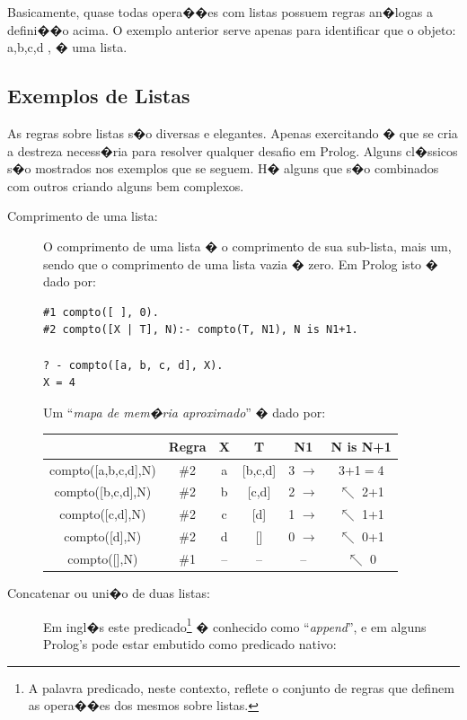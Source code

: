 \documentclass[final,a4paper]{article}
\begin{document}
Basicamente, quase todas opera��es com listas possuem regras an�logas a defini��o acima. O exemplo anterior serve apenas para identificar que o  objeto: \lbrack a,b,c,d \rbrack ,  � uma lista.

\newpage

\subsection{Exemplos de Listas}

As regras sobre listas s�o diversas e elegantes. Apenas exercitando
� que se cria a destreza necess�ria para resolver qualquer
desafio em Prolog.
Alguns  cl�ssicos s�o mostrados nos exemplos que se seguem. H� alguns
que s�o combinados com outros criando alguns bem complexos.


\begin{description}

\item [Comprimento de uma lista:]
O comprimento de uma lista � o comprimento de sua sub-lista, mais um,
sendo que o comprimento de uma lista vazia � zero. Em Prolog
isto � dado por:

\begin{verbatim}
#1 compto([ ], 0).
#2 compto([X | T], N):- compto(T, N1), N is N1+1.

? - compto([a, b, c, d], X).
X = 4
\end{verbatim}
Um ``{\em mapa de mem�ria aproximado}'' � dado por:

\begin{center}
\begin{tabular}[c]{|c|c|c|c|c|c|}
\hline
& Regra & X & T & N1 & N is N+1\\\hline
compto([a,b,c,d],N) & \#2 & a & [b,c,d] & 3 $\rightarrow$ & 3+1$=$4\\\hline
compto([b,c,d],N) & \#2 & b & [c,d] & 2 $\rightarrow$ & $\nwarrow$ 2+1\\\hline
compto([c,d],N) & \#2 & c & [d] & 1 $\rightarrow$ & $\nwarrow$ 1+1\\\hline
compto([d],N) & \#2 & d & [] & 0 $\rightarrow$ & $\nwarrow$ 0+1\\\hline
compto([],N) & \#1 & -- & -- & -- & $\nwarrow$ 0\\\hline
\end{tabular}
\end{center}

\newpage
\item [Concatenar ou uni�o de  duas listas:] Em ingl�s este predicado\footnote{A palavra predicado, neste contexto, reflete o conjunto de regras que definem as opera��es dos mesmos sobre listas.} � conhecido como ``{\em append}'', e em alguns Prolog's pode estar embutido como predicado nativo:


\end{description}
\end{document}
